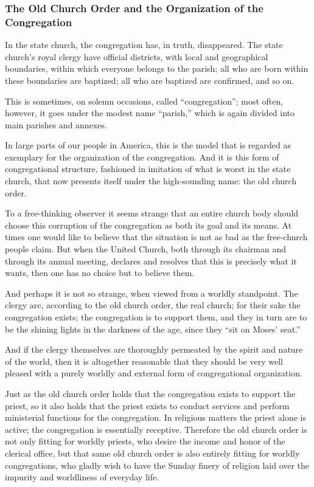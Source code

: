 
\subsubsection{The Old Church Order and the Organization of the Congregation}

In the state church, the congregation has, in truth, disappeared. The state church’s royal clergy have official districts, with local and geographical boundaries, within which everyone belongs to the parish; all who are born within these boundaries are baptized; all who are baptized are confirmed, and so on.

This is sometimes, on solemn occasions, called “congregation”; most often, however, it goes under the modest name “parish,” which is again divided into main parishes and annexes.

In large parts of our people in America, this is the model that is regarded as exemplary for the organization of the congregation. And it is this form of congregational structure, fashioned in imitation of what is worst in the state church, that now presents itself under the high-sounding name: the old church order.

To a free-thinking observer it seems strange that an entire church body should choose this corruption of the congregation as both its goal and its means. At times one would like to believe that the situation is not as bad as the free-church people claim. But when the United Church, both through its chairman and through its annual meeting, declares and resolves that this is precisely what it wants, then one has no choice but to believe them.

And perhaps it is not so strange, when viewed from a worldly standpoint. The clergy are, according to the old church order, the real church; for their sake the congregation exists; the congregation is to support them, and they in turn are to be the shining lights in the darkness of the age, since they “sit on Moses’ seat.”

And if the clergy themselves are thoroughly permeated by the spirit and nature of the world, then it is altogether reasonable that they should be very well pleased with a purely worldly and external form of congregational organization.

Just as the old church order holds that the congregation exists to support the priest, so it also holds that the priest exists to conduct services and perform ministerial functions for the congregation. In religious matters the priest alone is active; the congregation is essentially receptive. Therefore the old church order is not only fitting for worldly priests, who desire the income and honor of the clerical office, but that same old church order is also entirely fitting for worldly congregations, who gladly wish to have the Sunday finery of religion laid over the impurity and worldliness of everyday life.

